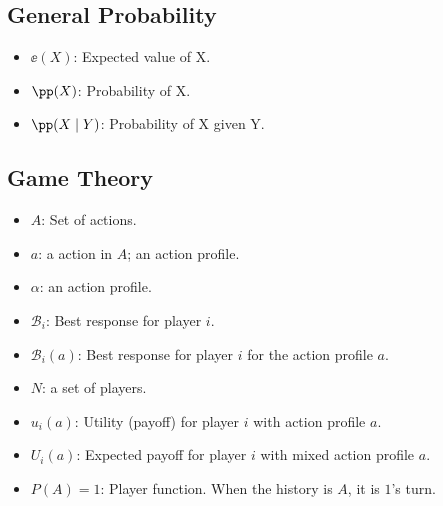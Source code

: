 \subsection{General Probability}
\begin{itemize}
    \item $\ee(X)$: Expected value of X.
    \item $\pp(X)$: Probability of X.
    \item $\pp(X\mid Y)$: Probability of X given Y.
\end{itemize}


\subsection{Game Theory}
\begin{itemize}
    \item $A$: Set of actions.
    \item $a$: a action in $A$; an action profile.
    \item $\alpha$: an action profile.
    \item $\mathcal{B}_i$: Best response for player $i$.
    \item $\mathcal{B}_i(a)$: Best response for player $i$ for the action profile $a$.
    \item $N$: a set of players.
    \item $u_i(a)$: Utility (payoff) for player $i$ with action profile $a$.
    \item $U_i(a)$: Expected payoff for player $i$ with mixed action profile $a$.
    \item $P(A) = 1$: Player function. When the history is $A$, it is $1$'s turn.
\end{itemize}
